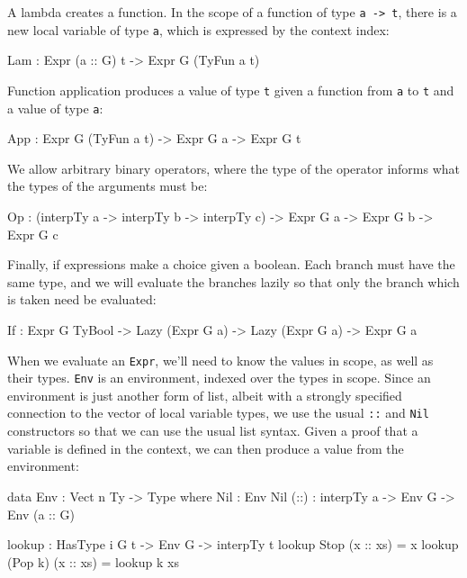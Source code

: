 \noindent
A lambda creates a function.
In the scope of a function of type \texttt{a -> t}, there is a new local variable of type \texttt{a}, which is expressed by the context index:

\begin{code}
Lam : Expr (a :: G) t -> Expr G (TyFun a t)
\end{code}

\noindent
Function application produces a value of type \texttt{t} given a function from  \texttt{a} to \texttt{t} and a value of type \texttt{a}:

\begin{code}
App : Expr G (TyFun a t) -> Expr G a -> Expr G t
\end{code}

\noindent
We allow arbitrary binary operators, where the type of the operator informs what the types of the arguments must be:

\begin{code}
Op  : (interpTy a -> interpTy b -> interpTy c) -> Expr G a -> Expr G b ->
      Expr G c
\end{code}

\noindent
Finally, if expressions make a choice given a boolean.
Each branch must have the same type, and we will evaluate the branches
lazily so that only the branch which is taken need be evaluated:

\begin{code}
If  : Expr G TyBool -> Lazy (Expr G a) -> Lazy (Expr G a) -> Expr G a
\end{code}

\noindent
When we evaluate an \texttt{Expr}, we'll need to know the values in scope, as well as their types.
\texttt{Env} is an environment, indexed over the types in scope.
Since an environment is just another form of list, albeit with a strongly specified connection to the vector of local variable types, we use the usual \texttt{::} and \texttt{Nil} constructors so that we can use the usual list syntax.
Given a proof that a variable is defined in the context, we can then produce a value from the environment:

\begin{code}
data Env : Vect n Ty -> Type where
    Nil  : Env Nil
    (::) : interpTy a -> Env G -> Env (a :: G)

lookup : HasType i G t -> Env G -> interpTy t
lookup Stop    (x :: xs) = x
lookup (Pop k) (x :: xs) = lookup k xs
\end{code}

